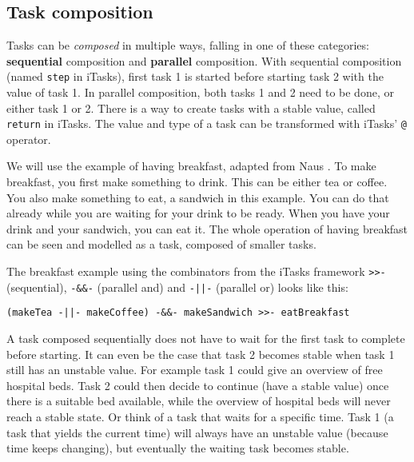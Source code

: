 \subsection{Task composition}
Tasks can be \textit{composed} in multiple ways, falling in one of these categories: \textbf{sequential} composition and \textbf{parallel} composition. With sequential composition (named \texttt{step} in iTasks), first task 1 is started before starting task 2 with the value of task 1. In parallel composition, both tasks 1 and 2 need to be done, or either task 1 or 2. There is a way to create tasks with a stable value, called \texttt{return} in iTasks. The value and type of a task can be transformed with iTasks' \texttt{@} operator.

We will use the example of having breakfast, adapted from Naus \cite{naus2020assisting}. To make breakfast, you first make something to drink. This can be either tea or coffee. You also make something to eat, a sandwich in this example. You can do that already while you are waiting for your drink to be ready. When you have your drink and your sandwich, you can eat it. The whole operation of having breakfast can be seen and modelled as a task, composed of smaller tasks.

The breakfast example using the combinators from the iTasks framework \texttt{>>-} (sequential), \texttt{-&&-} (parallel and) and \texttt{-||-} (parallel or) looks like this:
\begin{verbatim}
(makeTea -||- makeCoffee) -&&- makeSandwich >>- eatBreakfast
\end{verbatim}


A task composed sequentially does not have to wait for the first task to complete before starting. It can even be the case that task 2 becomes stable when task 1 still has an unstable value. For example task 1 could give an overview of free hospital beds. Task 2 could then decide to continue (have a stable value) once there is a suitable bed available, while the overview of hospital beds will never reach a stable state. Or think of a task that waits for a specific time. Task 1 (a task that yields the current time) will always have an unstable value (because time keeps changing), but eventually the waiting task becomes stable.

